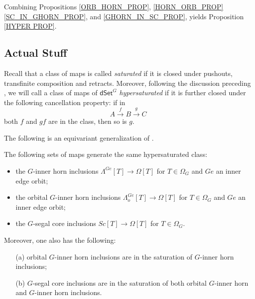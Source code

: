 \documentclass[a4paper,10pt,draft]{article}%
\numberwithin{equation}{section}%
\begin{document}
Combining Propositions \ref{ORB_HORN_PROP}, \ref{HORN_ORB_PROP} \ref{SC_IN_GHORN_PROP}, and \ref{GHORN_IN_SC_PROP}, yields Proposition \ref{HYPER PROP}.



















\subsection{Actual Stuff}

Recall that a class of maps is called \textit{saturated}
if it is closed under pushouts, transfinite composition and retracts.
Moreover, following the discussion preceding \cite[Prop. 3.6.8]{HHM16}, we will call a class of maps of $\mathsf{dSet}^G$ \textit{hypersaturated} if it is further closed under the following cancellation property: if in
\[
A \xrightarrow{f} B \xrightarrow{g} C
\]
both $f$ and $gf$ are in the class, then so is $g$.

The following is an equivariant generalization of 
\cite[Props. 2.4 and 2.5]{CM13a}.

\begin{proposition}\label{HYPER PROP}
The following sets of maps generate the same hypersaturated class:
\begin{itemize}
\item the $G$-inner horn inclusions
$\Lambda^{Ge} [T] \to \Omega[T]$ for $T \in \Omega_G$ and $Ge$ an inner edge orbit; 
\item the orbital $G$-inner horn inclusions
$\Lambda^{Ge}_o [T] \to \Omega[T]$ for $T \in \Omega_G$ and $Ge$ an inner edge orbit; 
\item the $G$-segal core inclusions
$Sc [T] \to \Omega[T]$ for $T \in \Omega_G$.
\end{itemize}
Moreover, one also has the following:
\begin{itemize}
	\item[(a)] orbital $G$-inner horn inclusions are in the saturation of $G$-inner horn inclusions;
	\item[(b)] $G$-segal core inclusions are in the saturation of both orbital $G$-inner horn and $G$-inner horn inclusions.
\end{itemize}
\end{proposition}
\end{document}
